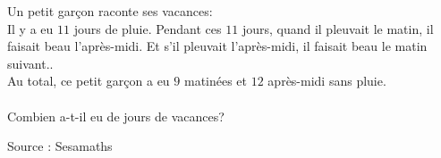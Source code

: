 
Un petit garçon raconte ses vacances:\\

\og Il y a eu $11$ jours de pluie. Pendant ces $11$ jours, quand il pleuvait le matin, il faisait beau l'après-midi. Et s'il pleuvait l'après-midi, il faisait beau le matin suivant.\fg{}.\\
Au total, ce petit garçon a eu $9$ matinées et $12$ après-midi sans pluie.\\
\vspace{0.1cm}\\
Combien a-t-il eu de jours de vacances?    

\hfill{{\scriptsize Source : Sesamaths}}